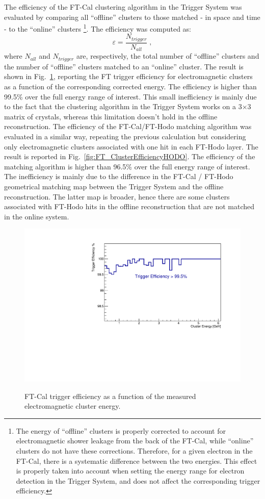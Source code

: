The efficiency of the FT-Cal clustering algorithm in the Trigger System was evaluated by comparing all
``offline'' clusters to those matched - in space and time - to the ``online'' clusters \footnote{The energy of
  ``offline'' clusters is properly corrected to account for electromagnetic shower leakage from the back of
  the FT-Cal, while ``online'' clusters do not have these corrections. Therefore, for a given electron in the
  FT-Cal, there is a systematic difference between the two energies. This effect is properly taken into account
  when setting the energy range for electron detection in the Trigger System, and does not affect the
  corresponding trigger efficiency.}. The efficiency was computed as:
\begin{equation}
\varepsilon=\frac{N_{trigger}}{N_{all}} \; ,
\end{equation}
where $N_{all}$ and $N_{trigger}$ are, respectively, the total number of ``offline'' clusters and the number of
``offline'' clusters matched to an ``online'' cluster. The result is shown in Fig.~\ref{fig:FT_ClusterEfficiency},
reporting the FT trigger efficiency for electromagnetic clusters as a function of the corresponding corrected
energy. The efficiency is higher than 99.5\% over the full energy range of interest. This small inefficiency
is mainly due to the fact that the clustering algorithm in the Trigger System works on a 3$\times$3 matrix of
crystals, whereas this limitation doesn't hold in the offline reconstruction. The efficiency of the FT-Cal/FT-Hodo
matching algorithm was evaluated in a similar way, repeating the previous calculation but considering only
electromagnetic clusters associated with one hit in each FT-Hodo layer. The result is reported in
Fig.~\ref{fig:FT_ClusterEfficiencyHODO}. The efficiency of the matching algorithm is higher than 96.5\% over
the full energy range of interest. The inefficiency is mainly due to the difference in the FT-Cal / FT-Hodo
geometrical matching map between the Trigger System and the offline reconstruction. The latter map is
broader, hence there are some clusters associated with FT-Hodo hits in the offline reconstruction that are not
matched in the online system. 

\begin{figure}[!htb]
 \centering
{\includegraphics[width=.5\textwidth]{img/FT_ClusterEfficiency.pdf}}
 \caption{FT-Cal trigger efficiency as a function of the measured electromagnetic cluster energy.}
 \label{fig:FT_ClusterEfficiency}
\end{figure}

